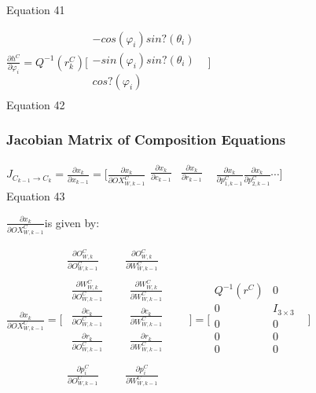 Equation 41

$\frac{\partial h^{C}}{\partial \varphi _{i}}= Q^{-1}(r_{k}^{C})\lbrack 
\begin{matrix}
-cos(\varphi _{i})sin?(\theta _{i}) & \\
-sin(\varphi _{i})sin?(\theta _{i}) & \\
cos?(\varphi _{i}) & \\
\end{matrix}
\rbrack $\\


Equation 42

\subsubsection{Jacobian Matrix of Composition Equations}
$J_{C_{k-1}\to C_{k}}=\frac{\partial x_{k}}{\partial x_{k-1}}=\lbrack 
\frac{\partial x_{k}}{\partial OX_{W, k-1}^{C}}\begin{matrix}
\frac{\partial x_{k}}{\partial c_{k-1}} & \frac{\partial x_{k}}{\partial 
r_{k-1}} & \\
\end{matrix}
\frac{\partial x_{k}}{\partial p_{1, k-1}^{C}}\frac{\partial 
x_{k}}{\partial p_{2, k-1}^{C}} \cdots \rbrack $\\


Equation 43

$\frac{\partial x_{k}}{\partial OX_{W, k-1}^{C}}$is given by:

$\frac{\partial x_{k}}{\partial OX_{W, k-1}^{C}}=\lbrack \begin{matrix}
\frac{\partial O_{W,k}^{C}}{\partial O_{W,k-1}^{C}} & \frac{\partial 
O_{W,k}^{C}}{\partial W_{W,k-1}^{C}} & \\
\begin{matrix}
\frac{\partial W_{W,k}^{C}}{\partial O_{W,k-1}^{C}} & \\
\frac{\partial c_{k}}{\partial O_{W,k-1}^{C}} & \\
\frac{\partial r_{k}}{\partial O_{W,k-1}^{C}} & \\
\end{matrix}
 & \begin{matrix}
\frac{\partial W_{W,k}^{C}}{\partial W_{W,k-1}^{C}} & \\
\frac{\partial c_{k}}{\partial W_{W,k-1}^{C}} & \\
\frac{\partial r_{k}}{\partial W_{W,k-1}^{C}} & \\
\end{matrix}
 & \\
\frac{\partial p_{i}^{C}}{\partial O_{W,k-1}^{C}} & \frac{\partial 
p_{i}^{C}}{\partial W_{W,k-1}^{C}} & \\
\end{matrix}
\rbrack =\lbrack \begin{matrix}
Q^{-1}(r^{C}) & 0 & \\
0 & I_{3\times 3} & \\
0 & 0 & \\
0 & 0 & \\
0 & 0 & \\
\end{matrix}
\rbrack $\\


